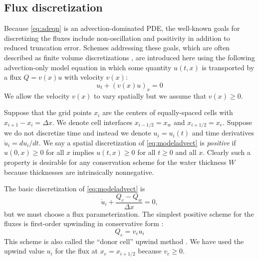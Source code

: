 \documentclass[11pt,final]{amsart}%
\begin{document}
\subsection*{Flux discretization}  Because \eqref{eq:adeqn} is an advection-dominated PDE, the well-known goals for discretizing the fluxes include non-oscillation and positivity \citep{HundsdorferVerwer2010} in addition to reduced truncation error.  Schemes addressing these goals, which are often described as finite volume discretizations \citep{LeVeque}, are introduced here using the following advection-only model equation in which some quantity $u(t,x)$ is transported by a flux $Q = v(x) u$ with velocity $v(x)$:
\begin{equation} \label{eq:modeladvect}
u_t + (v(x) u)_x = 0
\end{equation}
We allow the velocity $v(x)$ to vary spatially but we assume that $v(x)\ge 0$.

Suppose that the grid points $x_i$ are the centers of equally-spaced cells with $x_{i+1}-x_i=\Delta x$.  We denote cell interfaces $x_{i-1/2}=x_w$ and $x_{i+1/2}=x_e$.  Suppose we do not discretize time and instead we denote $u_i=u_i(t)$ and time derivatives $\dot u_i = du_i/dt$.  We say a spatial discretization of \eqref{eq:modeladvect} is \emph{positive} if $u(0,x)\ge 0$ for all $x$ implies $u(t,x)\ge 0$ for all $t\ge 0$ and all $x$.  Clearly such a property is desirable for any conservation scheme for the water thickness $W$ because thicknesses are intrinsically nonnegative.

The basic discretization of \eqref{eq:modeladvect} is
\begin{equation}
\dot u_i + \frac{Q_e - Q_w}{\Delta x} = 0, \label{eq:basicmodelFD}
\end{equation}
but we must choose a flux parameterization.  The simplest positive scheme for the fluxes is first-order upwinding in conservative form \citep[section I.4.3]{HundsdorferVerwer2010}:
\begin{equation}
Q_e = v_e u_i \label{eq:upwindfluxfirst}
\end{equation}
This scheme is also called the ``donor cell'' upwind method \citep{LeVeque}.  We have used the upwind value $u_i$ for the flux at $x_e=x_{i+1/2}$ because $v_e\ge 0$.
\end{document}
